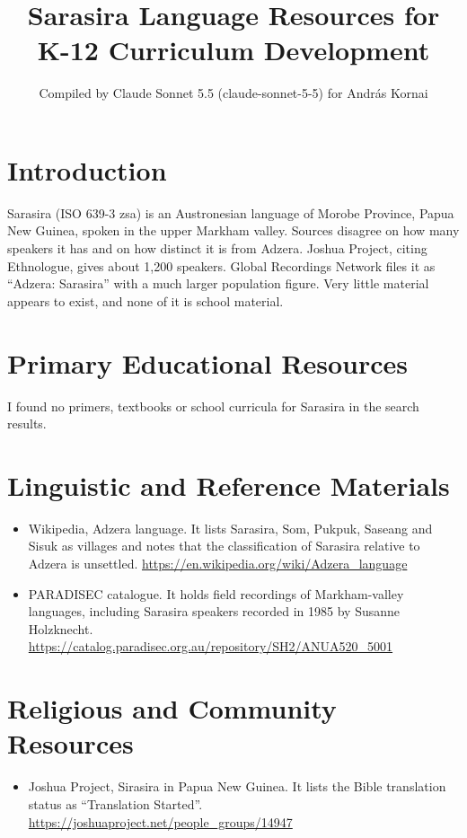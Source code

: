 \documentclass[12pt]{article}
\title{Sarasira Language Resources for K-12 Curriculum Development}
\author{Compiled by Claude Sonnet 5.5 (claude-sonnet-5-5) for Andr\'as Kornai}
\date{}
\begin{document}
\maketitle

\section{Introduction}
Sarasira (ISO 639-3 zsa) is an Austronesian language of Morobe Province, Papua New Guinea, spoken in the upper Markham valley. Sources disagree on how many speakers it has and on how distinct it is from Adzera. Joshua Project, citing Ethnologue, gives about 1,200 speakers. Global Recordings Network files it as ``Adzera: Sarasira'' with a much larger population figure. Very little material appears to exist, and none of it is school material.

\section{Primary Educational Resources}
I found no primers, textbooks or school curricula for Sarasira in the search results.

\section{Linguistic and Reference Materials}
\begin{itemize}
\item Wikipedia, Adzera language. It lists Sarasira, Som, Pukpuk, Saseang and Sisuk as villages and notes that the classification of Sarasira relative to Adzera is unsettled. \url{https://en.wikipedia.org/wiki/Adzera_language}
\item PARADISEC catalogue. It holds field recordings of Markham-valley languages, including Sarasira speakers recorded in 1985 by Susanne Holzknecht. \url{https://catalog.paradisec.org.au/repository/SH2/ANUA520_5001}
\end{itemize}

\section{Religious and Community Resources}
\begin{itemize}
\item Joshua Project, Sirasira in Papua New Guinea. It lists the Bible translation status as ``Translation Started''. \url{https://joshuaproject.net/people_groups/14947}
\end{itemize}
\end{document}
